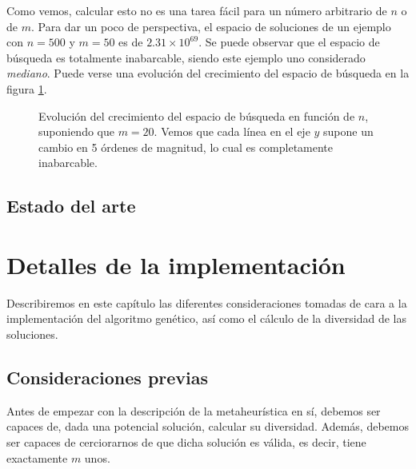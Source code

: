 Como vemos, calcular esto no es una tarea fácil para un número arbitrario de $n$ o de $m$. Para dar un poco de perspectiva, el espacio de soluciones de un ejemplo con $n = 500$ y $m = 50$ es de $2.31 \times 10^{69}$. Se puede observar que el espacio de búsqueda es totalmente inabarcable, siendo este ejemplo uno considerado \textit{mediano}. Puede verse una evolución del crecimiento del espacio de búsqueda en la figura \ref{fig:binom}.

\begin{figure}[h]
    \centering
    
    
        \caption{Evolución del crecimiento del espacio de búsqueda en función de $n$, suponiendo que $m = 20$. Vemos que cada línea en el eje $y$ supone un cambio en 5 órdenes de magnitud, lo cual es completamente inabarcable.}
        \label{fig:binom}
    
\end{figure}

\section{Estado del arte}





\chapter{Detalles de la implementación}

Describiremos en este capítulo las diferentes consideraciones tomadas de cara a la implementación del algoritmo genético, así como el cálculo de la diversidad de las soluciones.

\section{Consideraciones previas}
Antes de empezar con la descripción de la metaheurística en sí, debemos ser capaces de, dada una potencial solución, calcular su diversidad. Además, debemos ser capaces de cerciorarnos de que dicha solución es válida, es decir, tiene exactamente $m$ unos.

